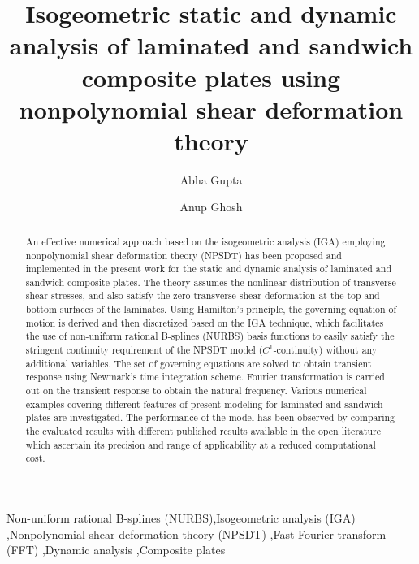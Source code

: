 \documentclass[3p,preprint,12pt]{elsarticle}
\begin{document}
\begin{frontmatter}
	
{\color{red}\title{Isogeometric static and dynamic analysis of laminated and sandwich composite plates using nonpolynomial shear deformation theory}}


\author{Abha Gupta}

\author{Anup Ghosh}

\address{Department of Aerospace Engineering, Indian Institute of Technology Kharagpur, W. Bengal 721302, India}
\begin{abstract}
	An effective numerical approach based on the isogeometric analysis (IGA) employing nonpolynomial shear deformation theory (NPSDT) has been proposed and implemented in the present work for the static and dynamic analysis of laminated and sandwich composite plates. The theory assumes the nonlinear distribution of transverse shear stresses, and also satisfy the zero transverse shear deformation at the top and bottom surfaces of the laminates. Using Hamilton’s principle, the governing equation of motion is derived and then discretized based on the IGA technique, which facilitates the use of non-uniform rational B-splines (NURBS) basis functions to easily satisfy the stringent continuity requirement of the NPSDT model ($C^1$-continuity) without any additional variables. %
	The set of governing equations are solved to obtain transient response using Newmark’s time integration scheme. Fourier transformation is carried out on the transient response to obtain the natural frequency. Various numerical examples covering different features of present modeling for laminated and sandwich plates are investigated. The performance of the model has been observed by comparing the evaluated results with different published results available in the open literature which ascertain its precision and range of applicability at a reduced computational cost.
\end{abstract}

\begin{keyword}
	Non-uniform rational B-splines (NURBS)\sep Isogeometric analysis (IGA) \sep Nonpolynomial shear deformation theory (NPSDT) \sep Fast Fourier transform (FFT) \sep Dynamic analysis  \sep Composite plates 
\end{keyword}
 
\end{frontmatter}
\linenumbers
\end{document}
